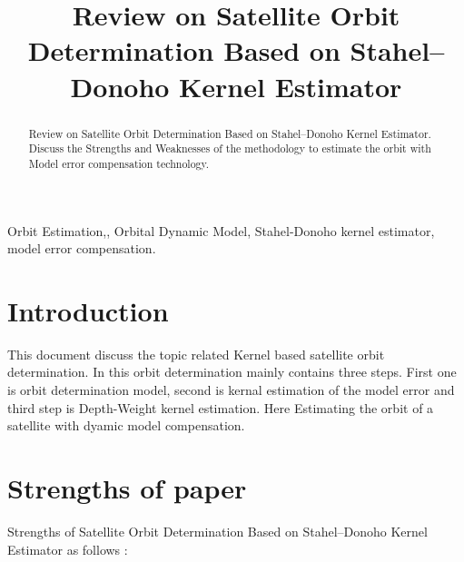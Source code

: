 \documentclass[conference]{IEEEtran}
\begin{document}
\title{Review on Satellite Orbit Determination Based on Stahel–Donoho Kernel Estimator\\
}

\author{
}

\maketitle

\begin{abstract}
Review on Satellite Orbit Determination Based on Stahel–Donoho Kernel Estimator. Discuss the Strengths and Weaknesses of the methodology to estimate the orbit with Model error compensation technology.  
\end{abstract}

\begin{IEEEkeywords}
Orbit Estimation,, Orbital Dynamic Model, Stahel-Donoho kernel estimator, model error
compensation. 
\end{IEEEkeywords}

\section{Introduction}
This document discuss the topic related Kernel based satellite orbit determination. In this orbit determination mainly contains three steps. First one is orbit determination model, second is kernal estimation of the model error and third step is Depth-Weight kernel estimation. Here Estimating the orbit of a satellite with dyamic model compensation.    

\section{Strengths of paper \cite{b1}}

Strengths of Satellite Orbit Determination Based on Stahel–Donoho Kernel Estimator as follows :
\end{document}
